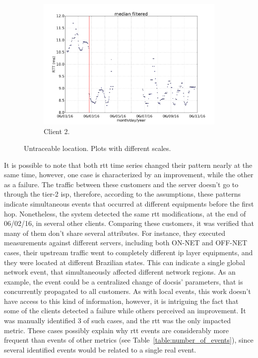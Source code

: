 \begin{figure}[H]
{\begin{subfigure}[b]{0.55\textwidth}
            \includegraphics[width=\textwidth]{./figures/results/wrong_examples/untraceable_example/serverBHZDTCLDM062_mac64:66:B3:50:00:B6_dtstart2016-06-01_dtend2016-06-11.png}
            \caption{Client 2.}\label{fig:untraceable_location_client_2}
        \end{subfigure}%
    }
    \caption{Untraceable location. Plots with different scales.}
\label{fig:untraceable_location}
\end{figure}%

It is possible to note that both \gls*{rtt} time series changed their pattern
nearly at the same time, however, one case is characterized by an improvement,
while the other as a failure.
The traffic between these customers and the server
doesn't go to through the tier-2 \gls*{isp}, therefore, according to the
assumptions, these patterns indicate simultaneous events that occurred at
different equipments before the first hop.
Nonetheless, the system detected the same \gls*{rtt} modifications, at the end of
06/02/16, in several other clients.
Comparing these customers, it was verified that many of them don't share
several attributes.
For instance, they executed measurements against different servers, including
both ON-NET and OFF-NET cases, their
upstream traffic went to completely different \gls*{ip} layer equipments, and they
were located at different Brazilian states.
This can indicate a single global network event, that simultaneously affected
different network regions. As an example, the event could be a centralized
change of \gls*{docsis}' parameters, that is concurrently propagated to all customers.
As with local events, this work doesn't have access to this kind of
information, however, it is intriguing the fact that some of the clients
detected a failure while others perceived an improvement.
It was manually identified 3 of such cases,
and the \gls*{rtt} was the only impacted metric.
These cases possibly explain why \gls*{rtt} events are considerably more
frequent than events of other metrics (see Table~\ref{table:number_of_events}),
since several identified events would be related to a single real event.

